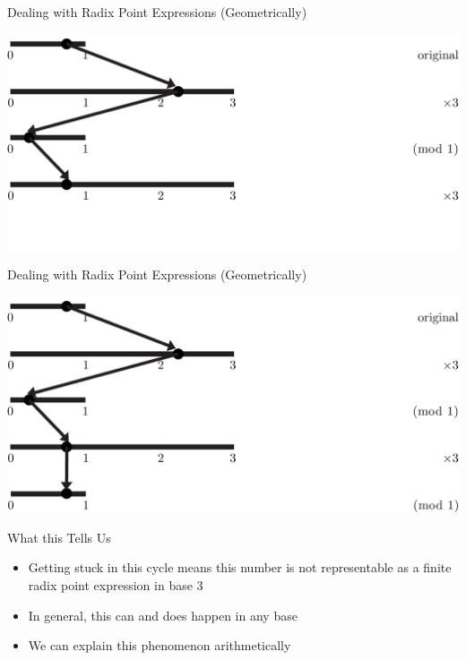 \documentclass{beamer}
\begin{document}
\begin{frame}{Dealing with Radix Point Expressions (Geometrically)}
  \begin{example}
    \includegraphics[width=\textwidth,height=0.75\textheight]{images/Ternary/4}
  \end{example}
\end{frame}

\begin{frame}{Dealing with Radix Point Expressions (Geometrically)}
  \begin{example}
    \includegraphics[width=\textwidth,height=0.75\textheight]{images/Ternary/5}
  \end{example}
\end{frame}

\begin{frame}{What this Tells Us}
  \begin{itemize}
    \item Getting stuck in this cycle means this number is not representable as a finite radix point expression in base 3 \pause
    \item In general, this can and does happen in any base \pause
    \item We can explain this phenomenon arithmetically
  \end{itemize}
\end{frame}
\end{document}

